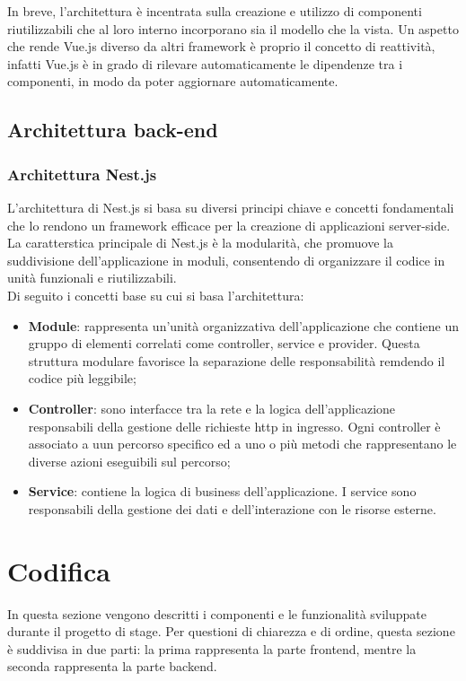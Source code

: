 In breve, l'architettura è incentrata sulla creazione e utilizzo di componenti riutilizzabili che al loro interno incorporano sia il modello che la vista. Un aspetto che rende Vue.js
diverso da altri framework è proprio il concetto di reattività, infatti Vue.js è in grado di rilevare automaticamente le dipendenze tra i componenti, in modo da poter aggiornare automaticamente.

\subsection{Architettura back-end}\label{subsec:architettura-back-end}
\subsubsection{Architettura Nest.js}\label{subsubsec:architettura-nest.js}
L'architettura di Nest.js si basa su diversi principi chiave e concetti fondamentali che lo rendono un framework efficace per la creazione di applicazioni server-side.
La caratterstica principale di Nest.js è la modularità, che promuove la suddivisione dell'applicazione in moduli, consentendo di organizzare il codice in unità funzionali e riutilizzabili.\\
Di seguito i concetti base su cui si basa l'architettura:
\begin{itemize}
  \item \textbf{Module}: rappresenta un'unità organizzativa dell'applicazione che contiene un gruppo di elementi correlati come controller, service e provider. Questa struttura modulare 
  favorisce la separazione delle responsabilità remdendo il codice più leggibile;
  \item \textbf{Controller}: sono interfacce tra la rete e la logica dell'applicazione responsabili della gestione delle richieste http in ingresso. Ogni controller è associato a uun percorso specifico ed a uno o più metodi che rappresentano le diverse azioni eseguibili sul percorso;
  \item \textbf{Service}: contiene la logica di business dell'applicazione. I service sono responsabili della gestione dei dati e dell'interazione con le risorse esterne.
\end{itemize}


\section{Codifica}
In questa sezione vengono descritti i componenti e le funzionalità sviluppate durante il progetto di stage. 
Per questioni di chiarezza e di ordine, questa sezione è suddivisa in due parti: la prima rappresenta la parte frontend, mentre la seconda rappresenta la parte backend.
